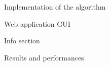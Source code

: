 \documentclass[9pt]{extarticle}
\begin{document}
\begin{section}{Implementation of the algorithm}
\begin{subsection}{Web application GUI}
\begin{subsubsection}{Info section}
            \end{subsubsection}
        \end{subsection}
    \end{section}

    \begin{section}{Results and performances}

    \end{section}
\end{document}
